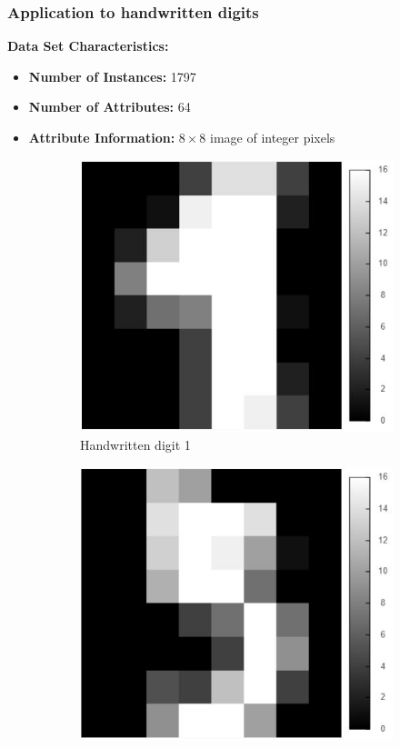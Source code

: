\documentclass{beamer}
\theoremstyle{plain}
\theoremstyle{definition}
\begin{document}
\begin{frame}
\frametitle{Application to handwritten digits}
\textbf{Data Set Characteristics:}
\begin{itemize}
\item \textbf{Number of Instances:} 1797
\item \textbf{Number of Attributes:} 64
\item \textbf{Attribute Information:} $8 \times 8$ image of integer pixels
\end{itemize}

\begin{figure}
\centering
	\begin{subfigure}{0.45\textwidth}
	\centering
	\captionsetup{justification=centering}
	\includegraphics[width = \textwidth]{figures/handwritten_digits_dataset_1.jpg}
	\caption{Handwritten digit 1}
	\end{subfigure}
	\begin{subfigure}{0.45\textwidth}
	\centering
	\captionsetup{justification=centering}
	\includegraphics[width = \textwidth]{figures/handwritten_digits_dataset_5.jpg}

\end{subfigure}
\end{figure}
\end{frame}
\end{document}
